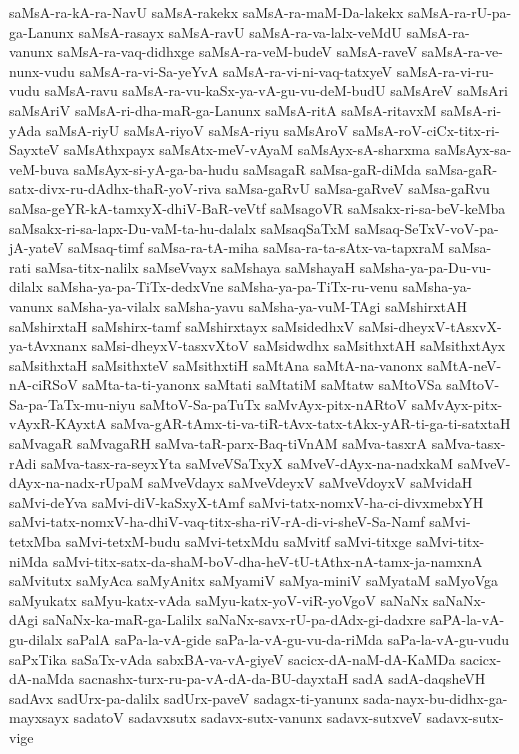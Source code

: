 {saMsA-ra-kA-ra-NavU
saMsA-rakekx
saMsA-ra-maM-Da-lakekx
saMsA-ra-rU-pa-ga-Lanunx
saMsA-rasayx
saMsA-ravU
saMsA-ra-va-lalx-veMdU
saMsA-ra-vanunx
saMsA-ra-vaq-didhxge
saMsA-ra-veM-budeV
saMsA-raveV
saMsA-ra-ve-nunx-vudu
saMsA-ra-vi-Sa-yeYvA
saMsA-ra-vi-ni-vaq-tatxyeV
saMsA-ra-vi-ru-vudu
saMsA-ravu
saMsA-ra-vu-kaSx-ya-vA-gu-vu-deM-budU
saMsAreV
saMsAri
saMsAriV
saMsA-ri-dha-maR-ga-Lanunx
saMsA-ritA
saMsA-ritavxM
saMsA-ri-yAda
saMsA-riyU
saMsA-riyoV
saMsA-riyu
saMsAroV
saMsA-roV-ciCx-titx-ri-SayxteV
saMsAthxpayx
saMsAtx-meV-vAyaM
saMsAyx-sA-sharxma
saMsAyx-sa-veM-buva
saMsAyx-si-yA-ga-ba-hudu
saMsagaR
saMsa-gaR-diMda
saMsa-gaR-satx-divx-ru-dAdhx-thaR-yoV-riva
saMsa-gaRvU
saMsa-gaRveV
saMsa-gaRvu
saMsa-geYR-kA-tamxyX-dhiV-BaR-veVtf
saMsagoVR
saMsakx-ri-sa-beV-keMba
saMsakx-ri-sa-lapx-Du-vaM-ta-hu-dalalx
saMsaqSaTxM
saMsaq-SeTxV-voV-pa-jA-yateV
saMsaq-timf
saMsa-ra-tA-miha
saMsa-ra-ta-sAtx-va-tapxraM
saMsa-rati
saMsa-titx-nalilx
saMseVvayx
saMshaya
saMshayaH
saMsha-ya-pa-Du-vu-dilalx
saMsha-ya-pa-TiTx-dedxVne
saMsha-ya-pa-TiTx-ru-venu
saMsha-ya-vanunx
saMsha-ya-vilalx
saMsha-yavu
saMsha-ya-vuM-TAgi
saMshirxtAH
saMshirxtaH
saMshirx-tamf
saMshirxtayx
saMsidedhxV
saMsi-dheyxV-tAsxvX-ya-tAvxnanx
saMsi-dheyxV-tasxvXtoV
saMsidwdhx
saMsithxtAH
saMsithxtAyx
saMsithxtaH
saMsithxteV
saMsithxtiH
saMtAna
saMtA-na-vanonx
saMtA-neV-nA-ciRSoV
saMta-ta-ti-yanonx
saMtati
saMtatiM
saMtatw
saMtoVSa
saMtoV-Sa-pa-TaTx-mu-niyu
saMtoV-Sa-paTuTx
saMvAyx-pitx-nARtoV
saMvAyx-pitx-vAyxR-KAyxtA
saMva-gAR-tAmx-ti-va-tiR-tAvx-tatx-tAkx-yAR-ti-ga-ti-satxtaH
saMvagaR
saMvagaRH
saMva-taR-parx-Baq-tiVnAM
saMva-tasxrA
saMva-tasx-rAdi
saMva-tasx-ra-seyxYta
saMveVSaTxyX
saMveV-dAyx-na-nadxkaM
saMveV-dAyx-na-nadx-rUpaM
saMveVdayx
saMveVdeyxV
saMveVdoyxV
saMvidaH
saMvi-deYva
saMvi-diV-kaSxyX-tAmf
saMvi-tatx-nomxV-ha-ci-divxmebxYH
saMvi-tatx-nomxV-ha-dhiV-vaq-titx-sha-riV-rA-di-vi-sheV-Sa-Namf
saMvi-tetxMba
saMvi-tetxM-budu
saMvi-tetxMdu
saMvitf
saMvi-titxge
saMvi-titx-niMda
saMvi-titx-satx-da-shaM-boV-dha-heV-tU-tAthx-nA-tamx-ja-namxnA
saMvitutx
saMyAca
saMyAnitx
saMyamiV
saMya-miniV
saMyataM
saMyoVga
saMyukatx
saMyu-katx-vAda
saMyu-katx-yoV-viR-yoVgoV
saNaNx
saNaNx-dAgi
saNaNx-ka-maR-ga-Lalilx
saNaNx-savx-rU-pa-dAdx-gi-dadxre
saPA-la-vA-gu-dilalx
saPalA
saPa-la-vA-gide
saPa-la-vA-gu-vu-da-riMda
saPa-la-vA-gu-vudu
saPxTika
saSaTx-vAda
sabxBA-va-vA-giyeV
sacicx-dA-naM-dA-KaMDa
sacicx-dA-naMda
sacnashx-turx-ru-pa-vA-dA-da-BU-dayxtaH
sadA
sadA-daqsheVH
sadAvx
sadUrx-pa-dalilx
sadUrx-paveV
sadagx-ti-yanunx
sada-nayx-bu-didhx-ga-mayxsayx
sadatoV
sadavxsutx
sadavx-sutx-vanunx
sadavx-sutxveV
sadavx-sutx-vige
}
